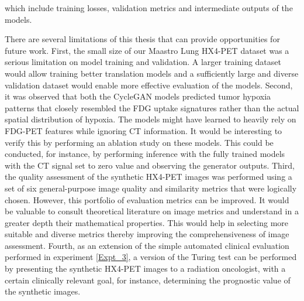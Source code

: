which include training losses, validation metrics and intermediate outputs of the models.

There are several limitations of this thesis that can provide opportunities for future work. First, the small size of our Maastro Lung HX4-PET dataset was a serious limitation on model training and validation. A larger training dataset would allow training better translation models and a sufficiently large and diverse validation dataset would enable more effective evaluation of the models. Second, it was observed that both the CycleGAN models predicted tumor hypoxia patterns that closely resembled the FDG uptake signatures rather than the actual spatial distribution of hypoxia. The models might have learned to heavily rely on FDG-PET features while ignoring CT information. It would be interesting to verify this by performing an ablation study on these models. This could be conducted, for instance, by performing inference with the fully trained models with the CT signal set to zero value and observing the generator outputs. Third, the quality assessment of the synthetic HX4-PET images was performed using a set of six general-purpose image quality and similarity metrics that were logically chosen. However, this portfolio of evaluation metrics can be improved. It would be valuable to consult theoretical literature on image metrics and understand in a greater depth their mathematical properties. This would help in selecting more suitable and diverse metrics thereby improving the comprehensiveness of image assessment. Fourth, as an extension of the simple automated clinical evaluation performed in experiment \ref{Expt_3}, a version of the Turing test can be performed by presenting the synthetic HX4-PET images to a radiation oncologist, with a certain clinically relevant goal, for instance, determining the prognostic value of the synthetic images. 


